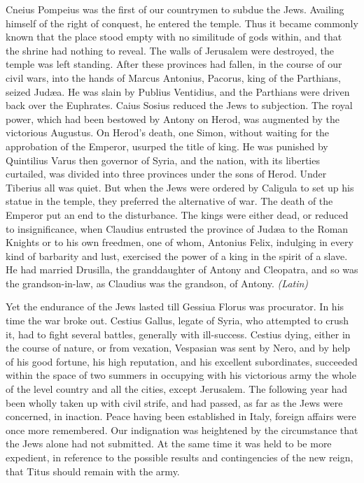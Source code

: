 
Cneius Pompeius was the first of our countrymen to subdue the Jews. Availing himself of the right of conquest, he entered the temple. Thus it became commonly known that the place stood empty with no similitude of gods within, and that the shrine had nothing to reveal. The walls of Jerusalem were destroyed, the temple was left standing. After these provinces had fallen, in the course of our civil wars, into the hands of Marcus Antonius, Pacorus, king of the Parthians, seized Judæa. He was slain by Publius Ventidius, and the Parthians were driven back over the Euphrates. Caius Sosius reduced the Jews to subjection. The royal power, which had been bestowed by Antony on Herod, was augmented by the victorious Augustus. On Herod's death, one Simon, without waiting for the approbation of the Emperor, usurped the title of king. He was punished by Quintilius Varus then governor of Syria, and the nation, with its liberties curtailed, was divided into three provinces under the sons of Herod. Under Tiberius all was quiet. But when the Jews were ordered by Caligula to set up his statue in the temple, they preferred the alternative of war. The death of the Emperor put an end to the disturbance. The kings were either dead, or reduced to insignificance, when Claudius entrusted the province of Judæa to the Roman Knights or to his own freedmen, one of whom, Antonius Felix, indulging in every kind of barbarity and lust, exercised the power of a king in the spirit of a slave. He had married Drusilla, the granddaughter of Antony and Cleopatra, and so was the grandson-in-law, as Claudius was the grandson, of Antony. \emph{(Latin)}


Yet the endurance of the Jews lasted till Gessiua Florus was procurator. In his time the war broke out. Cestius Gallus, legate of Syria, who attempted to crush it, had to fight several battles, generally with ill-success. Cestius dying, either in the course of nature, or from vexation, Vespasian was sent by Nero, and by help of his good fortune, his high reputation, and his excellent subordinates, succeeded within the space of two summers in occupying with his victorious army the whole of the level country and all the cities, except Jerusalem. The following year had been wholly taken up with civil strife, and had passed, as far as the Jews were concerned, in inaction. Peace having been established in Italy, foreign affairs were once more remembered. Our indignation was heightened by the circumstance that the Jews alone had not submitted. At the same time it was held to be more expedient, in reference to the possible results and contingencies of the new reign, that Titus should remain with the army.

